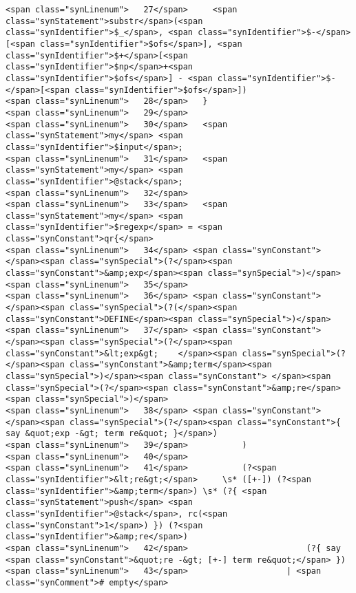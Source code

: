 \begin{verbatim}
<span class="synLinenum">   27</span>     <span class="synStatement">substr</span>(<span class="synIdentifier">$_</span>, <span class="synIdentifier">$-</span>[<span class="synIdentifier">$ofs</span>], <span class="synIdentifier">$+</span>[<span class="synIdentifier">$np</span>+<span class="synIdentifier">$ofs</span>] - <span class="synIdentifier">$-</span>[<span class="synIdentifier">$ofs</span>])
<span class="synLinenum">   28</span>   }
<span class="synLinenum">   29</span> 
<span class="synLinenum">   30</span>   <span class="synStatement">my</span> <span class="synIdentifier">$input</span>;
<span class="synLinenum">   31</span>   <span class="synStatement">my</span> <span class="synIdentifier">@stack</span>;
<span class="synLinenum">   32</span> 
<span class="synLinenum">   33</span>   <span class="synStatement">my</span> <span class="synIdentifier">$regexp</span> = <span class="synConstant">qr{</span>
<span class="synLinenum">   34</span> <span class="synConstant">      </span><span class="synSpecial">(?</span><span class="synConstant">&amp;exp</span><span class="synSpecial">)</span>
<span class="synLinenum">   35</span> 
<span class="synLinenum">   36</span> <span class="synConstant">      </span><span class="synSpecial">(?(</span><span class="synConstant">DEFINE</span><span class="synSpecial">)</span>
<span class="synLinenum">   37</span> <span class="synConstant">          </span><span class="synSpecial">(?</span><span class="synConstant">&lt;exp&gt;    </span><span class="synSpecial">(?</span><span class="synConstant">&amp;term</span><span class="synSpecial">)</span><span class="synConstant"> </span><span class="synSpecial">(?</span><span class="synConstant">&amp;re</span><span class="synSpecial">)</span>
<span class="synLinenum">   38</span> <span class="synConstant">                       </span><span class="synSpecial">(?</span><span class="synConstant">{ say &quot;exp -&gt; term re&quot; }</span>)
<span class="synLinenum">   39</span>           )
<span class="synLinenum">   40</span> 
<span class="synLinenum">   41</span>           (?<span class="synIdentifier">&lt;re&gt;</span>     \s* ([+-]) (?<span class="synIdentifier">&amp;term</span>) \s* (?{ <span class="synStatement">push</span> <span class="synIdentifier">@stack</span>, rc(<span class="synConstant">1</span>) }) (?<span class="synIdentifier">&amp;re</span>)
<span class="synLinenum">   42</span>                        (?{ say <span class="synConstant">&quot;re -&gt; [+-] term re&quot;</span> })
<span class="synLinenum">   43</span>                    | <span class="synComment"># empty</span>

\end{verbatim}
